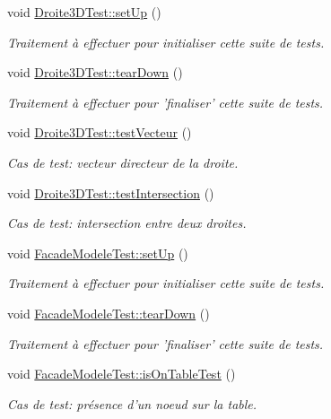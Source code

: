 \begin{DoxyCompactItemize}
void \hyperlink{group__inf2990_ga2058c915e823fa8ab26bad2c22554565}{Droite3\-D\-Test\-::set\-Up} ()
\begin{DoxyCompactList}\small\item\em Traitement à effectuer pour initialiser cette suite de tests. \end{DoxyCompactList}\item 
void \hyperlink{group__inf2990_gac9305147cf292b41834fabd24e57b976}{Droite3\-D\-Test\-::tear\-Down} ()
\begin{DoxyCompactList}\small\item\em Traitement à effectuer pour 'finaliser' cette suite de tests. \end{DoxyCompactList}\item 
void \hyperlink{group__inf2990_gaeae69515feaa3c448b7489289910c467}{Droite3\-D\-Test\-::test\-Vecteur} ()
\begin{DoxyCompactList}\small\item\em Cas de test\-: vecteur directeur de la droite. \end{DoxyCompactList}\item 
void \hyperlink{group__inf2990_gaa99e4b9c5f0916cef3b8dfe7ab8a4e9d}{Droite3\-D\-Test\-::test\-Intersection} ()
\begin{DoxyCompactList}\small\item\em Cas de test\-: intersection entre deux droites. \end{DoxyCompactList}\item 
void \hyperlink{group__inf2990_gaee2f8265a20182be11bcf8839311a8d8}{Facade\-Modele\-Test\-::set\-Up} ()
\begin{DoxyCompactList}\small\item\em Traitement à effectuer pour initialiser cette suite de tests. \end{DoxyCompactList}\item 
void \hyperlink{group__inf2990_ga864b95ee45f0949e36b3670ebe6fb7c4}{Facade\-Modele\-Test\-::tear\-Down} ()
\begin{DoxyCompactList}\small\item\em Traitement à effectuer pour 'finaliser' cette suite de tests. \end{DoxyCompactList}\item 
void \hyperlink{group__inf2990_gaddc1a794fa60c4a77818bd7ee7a4defe}{Facade\-Modele\-Test\-::is\-On\-Table\-Test} ()
\begin{DoxyCompactList}\small\item\em Cas de test\-: présence d'un noeud sur la table. \end{DoxyCompactList}\item 

\end{DoxyCompactItemize}
